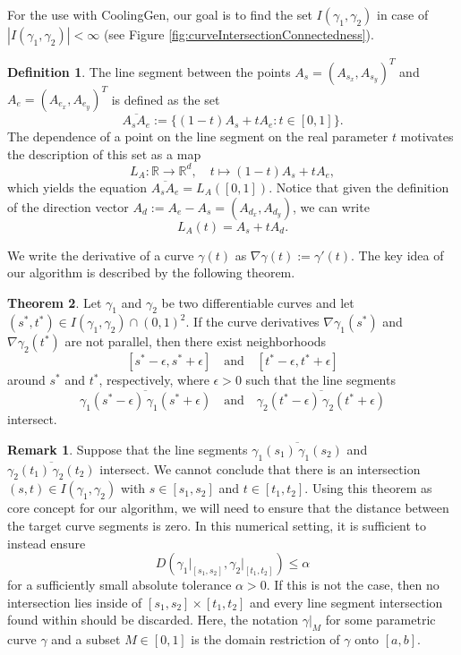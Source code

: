 \documentclass[a4paper, 11pt]{report}
\theoremstyle{definition}
\newtheorem{definition}{Definition}[section]
\newtheorem{theorem}[definition]{Theorem}
\newtheorem*{remark}{Remark}
\newcommand{\domrestr}{\big|}
\begin{document}
	For the use with CoolingGen, our goal is to find the set $I(\gamma_1, \gamma_2)$ in case of $|I(\gamma_1, \gamma_2)| < \infty$ (see Figure \ref{fig:curveIntersectionConnectedness}).

	\begin{definition}\label{def:linesegdef}
		The line segment between the points $A_s = (A_{s_x}, A_{s_y})^T$ and $A_e = (A_{e_x}, A_{e_y})^T$ is defined as the set
			$$ \overline{A_s A_e} := \{(1-t)A_s + tA_e : t \in [0,1]\}. $$
		The dependence of a point on the line segment on the real parameter $t$ motivates the description of this set as a map
			$$ L_A : \mathbb{R} \rightarrow \mathbb{R}^d, \quad t \mapsto (1-t)A_s + tA_e,$$
		which yields the equation $\overline{A_s A_e} = L_A([0,1])$. Notice that given the definition of the direction vector $A_d := A_e - A_s = (A_{d_x}, A_{d_y})$, we can write
			$$ L_A(t) = A_s + tA_d.$$
	\end{definition}
	
	We write the derivative of a curve $\gamma(t)$ as $\nabla \gamma(t) := \gamma'(t)$. The key idea of our algorithm is described by the following theorem.

	\begin{theorem}\label{thm:parallelintersection}
		Let $\gamma_1$ and $\gamma_2$ be two differentiable curves and let $(s^*, t^*) \in I(\gamma_1, \gamma_2) \cap (0,1)^2$. If the curve derivatives $\nabla\gamma_1(s^*)$ and $\nabla\gamma_2(t^*)$ are not parallel, then there exist neighborhoods 
			$$[s^*-\epsilon, s^*+\epsilon] \quad\text{and}\quad [t^*-\epsilon, t^*+\epsilon]$$
		around $s^*$ and $t^*$, respectively, where $\epsilon > 0$ such that the line segments
			$$\overline{\gamma_1(s^*-\epsilon) \, \gamma_1(s^*+\epsilon)} \quad\text{and}\quad \overline{\gamma_2(t^*-\epsilon) \, \gamma_2(t^*+\epsilon)}$$
		intersect. 
	\end{theorem}
	\begin{remark}
 		Suppose that the line segments $\overline{\gamma_1(s_1) \, \gamma_1(s_2)}$ and $\overline{\gamma_2(t_1) \, \gamma_2(t_2)}$ intersect. We cannot conclude that there is an intersection $(s,t) \in I(\gamma_1, \gamma_2)$ with $s \in [s_1, s_2]$ and $t \in [t_1, t_2]$. Using this theorem as core concept for our algorithm, we will need to ensure that the distance between the target curve segments is zero. In this numerical setting, it is sufficient to instead ensure
 			$$ D(\gamma_1 \domrestr_{[s_1, s_2]}, \gamma_2 \domrestr_{[t_1, t_2]}) \leq \alpha$$
 		for a sufficiently small absolute tolerance $\alpha > 0$. If this is not the case, then no intersection lies inside of $[s_1, s_2] \times [t_1, t_2]$ and every line segment intersection found within should be discarded. Here, the notation $\gamma \domrestr_M$ for some parametric curve $\gamma$ and a subset $M \in [0,1]$ is the domain restriction of $\gamma$ onto $[a,b]$.
	\end{remark}
	
\end{document}
